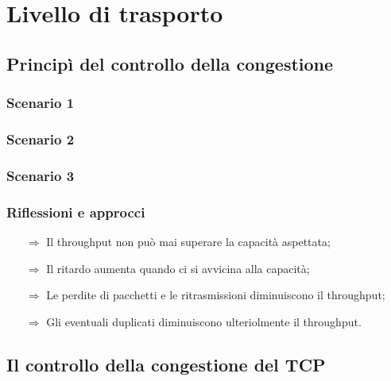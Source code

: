 \chapter{Livello di trasporto}

\section{Principì del controllo della congestione}

\subsection{Scenario 1}

\subsection{Scenario 2}

\subsection{Scenario 3}

\subsection{Riflessioni e approcci}

\begin{itemize}
    \item [$\Rightarrow$] Il throughput non può mai superare la capacità aspettata;
    \item [$\Rightarrow$] Il ritardo aumenta quando ci si avvicina alla capacità;
    \item [$\Rightarrow$] Le perdite di pacchetti e le ritrasmissioni diminuiscono il throughput;
    \item [$\Rightarrow$] Gli eventuali duplicati diminuiscono ulteriolmente il throughput.
\end{itemize}





\section{Il controllo della congestione del TCP}

